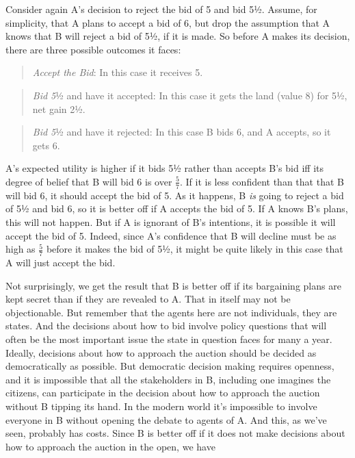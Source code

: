 \documentclass[
  10pt,
  letterpaper,
  DIV=11,
  numbers=noendperiod,
  twoside]{scrartcl}
\begin{document}
Consider again A's decision to reject the bid of 5 and bid 5½. Assume,
for simplicity, that A plans to accept a bid of 6, but drop the
assumption that A knows that B will reject a bid of 5½, if it is made.
So before A makes its decision, there are three possible outcomes it
faces:

\begin{quote}
\emph{Accept the Bid}: In this case it receives 5.
\end{quote}

\begin{quote}
\emph{Bid 5}½ and have it accepted: In this case it gets the land (value
8) for 5½, net gain 2½.
\end{quote}

\begin{quote}
\emph{Bid 5}½ and have it rejected: In this case B bids 6, and A
accepts, so it gets 6.
\end{quote}

A's expected utility is higher if it bids 5½ rather than accepts B's bid
iff its degree of belief that B will bid 6 is over \(\frac{5}{7}\). If
it is less confident than that that B will bid 6, it should accept the
bid of 5. As it happens, B \emph{is} going to reject a bid of 5½ and bid
6, so it is better off if A accepts the bid of 5. If A knows B's plans,
this will not happen. But if A is ignorant of B's intentions, it is
possible it will accept the bid of 5. Indeed, since A's confidence that
B will decline must be as high as \(\frac{5}{7}\) before it makes the
bid of 5½, it might be quite likely in this case that A will just accept
the bid.

Not surprisingly, we get the result that B is better off if its
bargaining plans are kept secret than if they are revealed to A. That in
itself may not be objectionable. But remember that the agents here are
not individuals, they are states. And the decisions about how to bid
involve policy questions that will often be the most important issue the
state in question faces for many a year. Ideally, decisions about how to
approach the auction should be decided as democratically as possible.
But democratic decision making requires openness, and it is impossible
that all the stakeholders in B, including one imagines the citizens, can
participate in the decision about how to approach the auction without B
tipping its hand. In the modern world it's impossible to involve
everyone in B without opening the debate to agents of A. And this, as
we've seen, probably has costs. Since B is better off if it does not
make decisions about how to approach the auction in the open, we have
\end{document}
